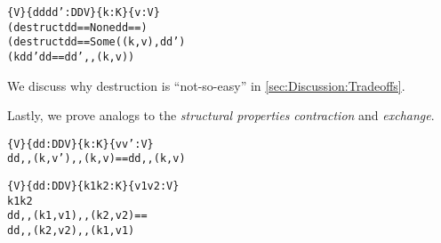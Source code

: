 \begin{theorem}
\label{thm:EzDstr}
\justIndent
\begin{alltt}
  \altFAll\{V\} \{dd dd' : DD V\} \{k : K\} \{v : V\} \altRArr
    (destruct dd == None \altRArr dd == \altEmpty)
      \altAnd
    (destruct dd == Some ((k , v) , dd') \altRArr
      (k \altNIn dd' \altAnd dd == dd' ,, (k , v))
\end{alltt}
\end{theorem}



\noindent
%
We discuss why destruction is ``not-so-easy'' in \autoref{sec:Discussion:Tradeoffs}.

Lastly, we prove analogs to the \emph{structural properties} \emph{contraction} and \emph{exchange}.


\pagebreak %

\begin{theorem}
\label{thm:cont-dicts}
\justIndent
\begin{alltt}
  \altFAll\{V\} \{dd : DD V\} \{k : K\} \{v v' : V\} \altRArr
    dd ,, (k , v') ,, (k , v) == dd ,, (k , v)
\end{alltt}
\end{theorem}

\begin{theorem}
\label{thm:exch-dicts}
\justIndent
\begin{alltt}
  \altFAll\{V\} \{dd : DD V\} \{k1 k2 : K\} \{v1 v2 : V\} \altRArr
    k1 \altNE k2 \altRArr
    dd ,, (k1 , v1) ,, (k2 , v2) ==
    dd ,, (k2 , v2) ,, (k1 , v1)
\end{alltt}
\end{theorem}
